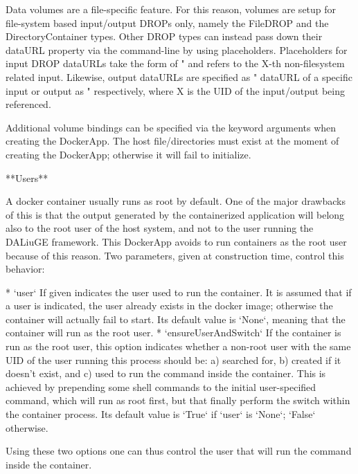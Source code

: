 \begin{DoxyVerb}
Data volumes are a file-specific feature. For this reason, volumes are setup
for file-system based input/output DROPs only, namely the FileDROP and the
DirectoryContainer types. Other DROP types can instead pass down their
dataURL property via the command-line by using placeholders. Placeholders
for input DROP dataURLs take the form of "%
and refers to the X-th non-filesystem related input. Likewise, output
dataURLs are specified as "%
dataURL of a specific input or output as "%
respectively, where X is the UID of the input/output being referenced.

Additional volume bindings can be specified via the keyword arguments when
creating the DockerApp. The host file/directories must exist at the moment
of creating the DockerApp; otherwise it will fail to initialize.

**Users**

A docker container usually runs as root by default. One of the major
drawbacks of this is that the output generated by the containerized
application will belong also to the root user of the host system, and not to
the user running the DALiuGE framework. This DockerApp avoids to run containers
as the root user because of this reason. Two parameters, given at
construction time, control this behavior:

* `user`
          If given indicates the user used to run the container. It is
          assumed that if a user is indicated, the user already exists in
          the docker image; otherwise the container will actually fail to
          start. Its default value is `None`, meaning that the container
          will run as the root user.
* `ensureUserAndSwitch`
          If the container is run as the root user, this
          option indicates whether a non-root user with the same UID of the
          user running this process should be: a) searched for, b) created
          if it doesn't exist, and c) used to run the command inside the
          container. This is achieved by prepending some shell commands to
          the initial user-specified command, which will run as root first,
          but that finally perform the switch within the container process.
          Its default value is `True` if `user` is `None`; `False`
          otherwise.

Using these two options one can thus control the user that will run the
command inside the container.


\end{DoxyVerb}
